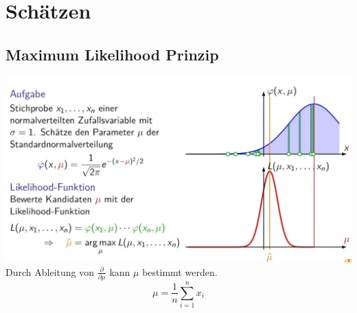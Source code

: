 \section{Schätzen}\label{schaetzen}

\subsection{Maximum Likelihood Prinzip}
\includegraphics[width=\columnwidth]{Images/mlp}
Durch Ableitung von $\frac{\partial}{\partial\mu}$ kann $\mu$ bestimmt werden.
\[
\mu = \frac{1}{n}\sum\limits_{i=1}^{n}x_i
\]